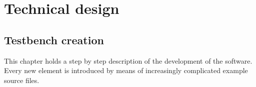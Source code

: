 
\chapter{Technical design} \label{TD}
\section{Testbench creation}
This chapter holds a step by step description of the development of the software. Every new element is introduced by means of increasingly complicated example source files.
